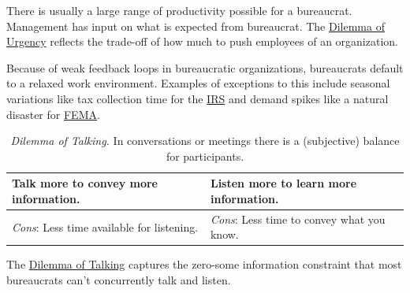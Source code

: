 There is usually a large range of productivity possible for a bureaucrat. Management has input on what is expected from bureaucrat. The \href{table:rate-of-work}{Dilemma of Urgency} reflects the trade-off of how much to push employees of an organization. 


Because of weak feedback loops in bureaucratic organizations, bureaucrats default to a relaxed work environment. Examples of exceptions to this include seasonal variations like tax collection time for the \href{https://en.wikipedia.org/wiki/Internal_Revenue_Service}{IRS} 
and demand spikes like a natural disaster for \href{https://en.wikipedia.org/wiki/Federal_Emergency_Management_Agency}{FEMA}. 

\begin{center}
\begin{table}[H] %
\begin{tabular}{ | m{\dilemmatablewidth}| m{\dilemmatablewidth} | } 
  \hline
  \textbf{Talk more to convey more information.} & 
  \textbf{Listen more to learn more information.} \\ 
  \hline
  \textit{Cons}: Less time available for listening. & 
  \textit{Cons}: Less time to convey what you know. \\  
  \hline
\end{tabular}
\caption{
\textit{Dilemma of Talking.}
In conversations or meetings there is a (subjective) balance for participants.
}
\label{table:talk-or-listen}
\end{table}
\end{center}

The \href{table:talk-or-listen}{Dilemma of Talking} captures the zero-some information constraint that most bureaucrats can't concurrently talk and listen. 

